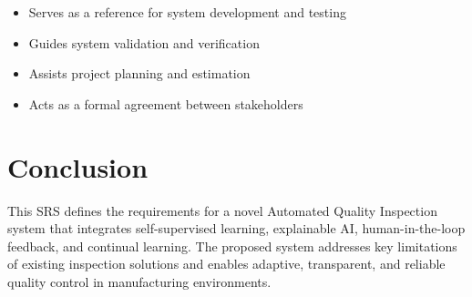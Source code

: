 \documentclass[12pt,a4paper]{article}
\begin{document}
\begin{itemize}
    \item Serves as a reference for system development and testing
    \item Guides system validation and verification
    \item Assists project planning and estimation
    \item Acts as a formal agreement between stakeholders
\end{itemize}

\section{Conclusion}

This SRS defines the requirements for a novel Automated Quality Inspection system that integrates self-supervised learning, explainable AI, human-in-the-loop feedback, and continual learning. The proposed system addresses key limitations of existing inspection solutions and enables adaptive, transparent, and reliable quality control in manufacturing environments.
\end{document}
